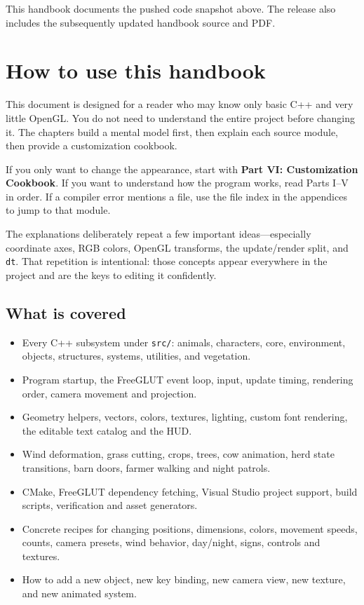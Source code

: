 \documentclass[11pt,a4paper,openany]{book}
\newcommand{\code}[1]{\texttt{#1}}
\newcommand{\file}[1]{\nolinkurl{#1}}
\begin{document}
\begin{titlepage}
	\vfill
	{\footnotesize\color{Muted} This handbook documents the pushed code snapshot above. The release also includes the subsequently updated handbook source and PDF.}
\end{titlepage}

\frontmatter
\hypersetup{pageanchor=true}
\chapter*{How to use this handbook}
This document is designed for a reader who may know only basic C++ and very little OpenGL. You do not need to understand the entire project before changing it. The chapters build a mental model first, then explain each source module, then provide a customization cookbook.

\begin{beginnerbox}
	If you only want to change the appearance, start with \textbf{Part VI: Customization Cookbook}. If you want to understand how the program works, read Parts I--V in order. If a compiler error mentions a file, use the file index in the appendices to jump to that module.
\end{beginnerbox}

The explanations deliberately repeat a few important ideas---especially coordinate axes, RGB colors, OpenGL transforms, the update/render split, and \code{dt}. That repetition is intentional: those concepts appear everywhere in the project and are the keys to editing it confidently.

\section*{What is covered}
\begin{itemize}
	\item Every C++ subsystem under \file{src/}: animals, characters, core, environment, objects, structures, systems, utilities, and vegetation.
	\item Program startup, the FreeGLUT event loop, input, update timing, rendering order, camera movement and projection.
	\item Geometry helpers, vectors, colors, textures, lighting, custom font rendering, the editable text catalog and the HUD.
	\item Wind deformation, grass cutting, crops, trees, cow animation, herd state transitions, barn doors, farmer walking and night patrols.
	\item CMake, FreeGLUT dependency fetching, Visual Studio project support, build scripts, verification and asset generators.
	\item Concrete recipes for changing positions, dimensions, colors, movement speeds, counts, camera presets, wind behavior, day/night, signs, controls and textures.
	\item How to add a new object, new key binding, new camera view, new texture, and new animated system.
\end{itemize}
\end{document}
